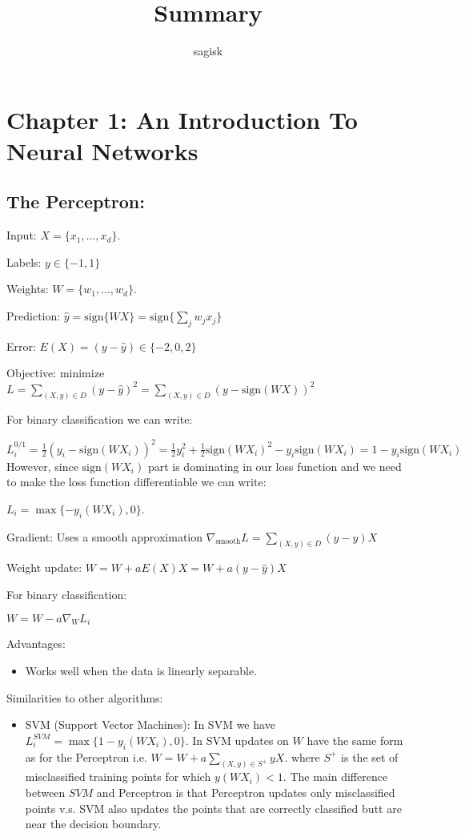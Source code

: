 \documentclass{article}
\title{Summary}
\author{sagisk}
\begin{document}
\maketitle

\section{Chapter 1: An Introduction To Neural Networks}

\subsection{The Perceptron:}

Input: $X = \{x_1,...,x_d\}$.

Labels: $y \in \{-1, 1\}$

Weights: $W = \{w_1,...,w_d\}$.

Prediction: $\hat{y} = \text{sign}\{WX\} = \text{sign}\{\sum_{j}w_jx_j\}$

Error: $E(X) = (y - \hat{y}) \in \{-2,0,2\}$

Objective: minimize $L = \sum_{(X,y) \in D}(y-\hat{y})^2 = \sum_{(X,y) \in D}(y-\text{sign}(WX))^2$

For binary classification we can write:

$L_{i}^{0/1} = \frac{1}{2}(y_i-\text{sign}(WX_i))^2 = \frac{1}{2}y_i^2 + \frac{1}{2}\text{sign}(WX_i)^2 - y_i\text{sign}(WX_i) = 1-y_i\text{sign}(WX_i)$
However, since $\text{sign}(WX_i)$ part is dominating in our loss function and we need to make the loss function differentiable we can write:

$L_i = \max\{-y_i(WX_i), 0\}$.

Gradient: Uses a smooth approximation $\nabla_{\text{smooth}}L = \sum_{(X,y)\in D}(y-\hat{y})X$

Weight update: $W = W + aE(X)X = W+a(y-\hat{y})X$

For binary classification:

$W = W - a\nabla_{W}L_i$

Advantages: 
\begin{itemize}
\item Works well when the data is linearly separable.
\end{itemize}

Similarities to other algorithms:


\begin{itemize}
\item SVM (Support Vector Machines): In SVM we  have $L_{i}^{SVM} = \max\{1-y_i(WX_i), 0\}$. In SVM updates on $W$ have the same form as for the Perceptron i.e. $W = W + a\sum_{(X,y) \in S^{+}}yX$. where $S^{+}$ is the set of misclassified training points for which $y(WX_i) < 1$. The main difference between $SVM$ and Perceptron is that Perceptron updates only misclassified points v.s. SVM also updates the points that are correctly classified butt are near the decision boundary.
\end{itemize}
\end{document}
